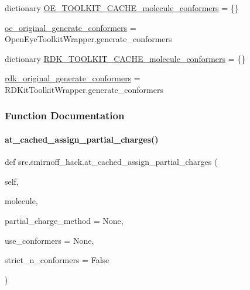 \begin{DoxyCompactItemize}
dictionary \hyperlink{namespacesrc_1_1smirnoff__hack_a243cd01daf172964f8cef9c72a47f0d2}{O\+E\+\_\+\+T\+O\+O\+L\+K\+I\+T\+\_\+\+C\+A\+C\+H\+E\+\_\+molecule\+\_\+conformers} = \{\}
\item 
\hyperlink{namespacesrc_1_1smirnoff__hack_a5f383fe1ef9076b565223487d947409f}{oe\+\_\+original\+\_\+generate\+\_\+conformers} = Open\+Eye\+Toolkit\+Wrapper.\+generate\+\_\+conformers
\item 
dictionary \hyperlink{namespacesrc_1_1smirnoff__hack_ad31e01f184e0f53b169f1273d9b11601}{R\+D\+K\+\_\+\+T\+O\+O\+L\+K\+I\+T\+\_\+\+C\+A\+C\+H\+E\+\_\+molecule\+\_\+conformers} = \{\}
\item 
\hyperlink{namespacesrc_1_1smirnoff__hack_a7347346d1b321bb20fab36632aad101c}{rdk\+\_\+original\+\_\+generate\+\_\+conformers} = R\+D\+Kit\+Toolkit\+Wrapper.\+generate\+\_\+conformers
\end{DoxyCompactItemize}


\subsubsection{Function Documentation}
\mbox{\label{namespacesrc_1_1smirnoff__hack_a8edfb04dec94c4a555b6cdd8396074be}} 
\paragraph{\texorpdfstring{at\+\_\+cached\+\_\+assign\+\_\+partial\+\_\+charges()}{at\_cached\_assign\_partial\_charges()}}
{\footnotesize\ttfamily def src.\+smirnoff\+\_\+hack.\+at\+\_\+cached\+\_\+assign\+\_\+partial\+\_\+charges (\begin{DoxyParamCaption}\item[{}]{self,  }\item[{}]{molecule,  }\item[{}]{partial\+\_\+charge\+\_\+method = {\ttfamily None},  }\item[{}]{use\+\_\+conformers = {\ttfamily None},  }\item[{}]{strict\+\_\+n\+\_\+conformers = {\ttfamily False} }\end{DoxyParamCaption})}



